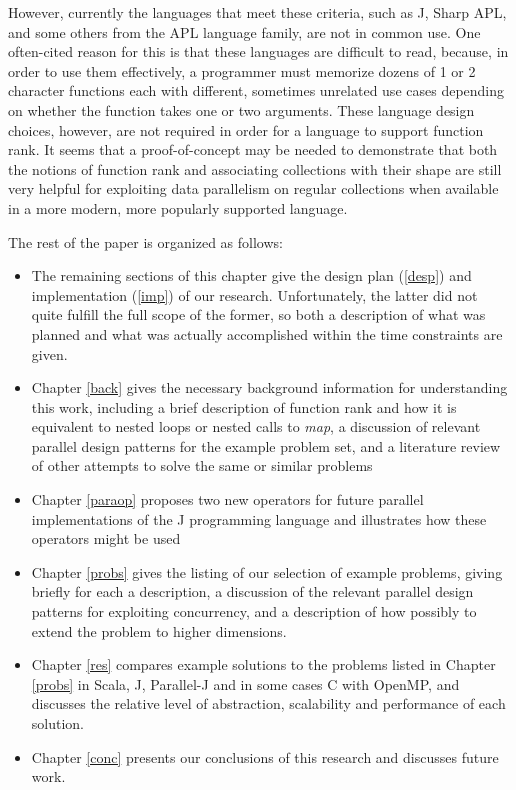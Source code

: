 However, currently the languages that meet these criteria, 
such as J, Sharp APL, and some others from the APL language family, 
are not in common use. %
One often-cited reason for this is that these languages are difficult to read, %
because, in order to use them effectively, a programmer must memorize 
dozens of 1 or 2 character functions each with different, sometimes unrelated use cases 
depending on whether the function takes one or two arguments\cite{jvocab}. %
These language design choices, however, 
are not required in order for a language to support function rank.
It seems that a proof-of-concept may be needed 
to demonstrate that both the notions of function rank
and associating collections with their shape
are still very helpful for exploiting data parallelism on regular collections 
when available in a more modern, more popularly supported language.

The rest of the paper is organized as follows:
\begin{itemize} 
	\item The remaining sections of this chapter give the design plan (\ref{desp}) and implementation (\ref{imp}) of our research. 
	Unfortunately, the latter did not quite fulfill the full scope of the former, 
	so both a description of what was planned and what was actually accomplished within the time constraints are given.
	\item Chapter \ref{back} gives the necessary background information for understanding this work, 
	including a brief description of function rank and how it is equivalent to nested loops or nested calls to \textit{map},
	a discussion of relevant parallel design patterns for the example problem set, 
	and a literature review of other attempts to solve the same or similar problems
	\item Chapter \ref{paraop} proposes two new operators for future parallel implementations of the J programming language 
		and illustrates how these operators might be used
    \item Chapter \ref{probs} gives the listing of our selection of example problems, giving briefly for each a description, a discussion of the relevant parallel design patterns for exploiting concurrency, and a description of how possibly to extend the problem to higher dimensions.
    \item Chapter \ref{res} compares example solutions to the problems listed in Chapter \ref{probs} in Scala, J, Parallel-J and in some cases C with OpenMP, and discusses the relative level of abstraction, scalability and performance of each solution. %
    \item Chapter \ref{conc} presents our conclusions of this research and discusses future work. 
\end{itemize}

